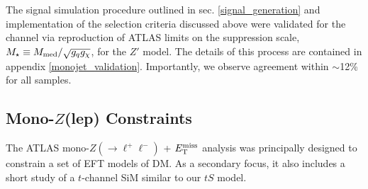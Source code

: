 The signal simulation procedure outlined in sec. \ref{signal_generation} and implementation of the selection criteria discussed above were validated for the \monojet channel via reproduction of ATLAS limits on the suppression scale, $M_{\star} \equiv M_{\mathrm{med}} / \sqrt{g_q g_{\chi}}$, for the $Z'$ model. The details of this process are contained in appendix \ref{monojet_validation}. Importantly, we observe agreement within $\sim$12\% for all samples.



\subsection{Mono-$Z$(lep) Constraints}
\label{monoZ_constraints}
The ATLAS mono-$Z(\rightarrow \ell^+ \ell^-)$ + $E_{\mathrm{T}}^{\mathrm{miss}}$ analysis \cite{Aad:2014monoZlep} was principally designed to constrain a set of EFT models of DM. As a secondary focus, it also includes a short study of a $t$-channel SiM similar to our $tS$ model.

